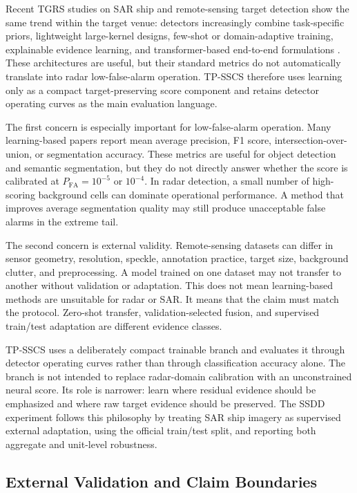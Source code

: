 \documentclass[journal]{IEEEtran}
\begin{document}
Recent TGRS studies on SAR ship and remote-sensing target detection show the same trend within the target venue: detectors increasingly combine task-specific priors, lightweight large-kernel designs, few-shot or domain-adaptive training, explainable evidence learning, and transformer-based end-to-end formulations \cite{liu2024evidence,zhou2024fewshot,shen2024ellknet,ma2024ssdnet,qin2025rdbdino}. These architectures are useful, but their standard metrics do not automatically translate into radar low-false-alarm operation. TP-SSCS therefore uses learning only as a compact target-preserving score component and retains detector operating curves as the main evaluation language.

The first concern is especially important for low-false-alarm operation. Many learning-based papers report mean average precision, F1 score, intersection-over-union, or segmentation accuracy. These metrics are useful for object detection and semantic segmentation, but they do not directly answer whether the score is calibrated at $P_{\mathrm{FA}}=10^{-5}$ or $10^{-4}$. In radar detection, a small number of high-scoring background cells can dominate operational performance. A method that improves average segmentation quality may still produce unacceptable false alarms in the extreme tail.

The second concern is external validity. Remote-sensing datasets can differ in sensor geometry, resolution, speckle, annotation practice, target size, background clutter, and preprocessing. A model trained on one dataset may not transfer to another without validation or adaptation. This does not mean learning-based methods are unsuitable for radar or SAR. It means that the claim must match the protocol. Zero-shot transfer, validation-selected fusion, and supervised train/test adaptation are different evidence classes.

TP-SSCS uses a deliberately compact trainable branch and evaluates it through detector operating curves rather than through classification accuracy alone. The branch is not intended to replace radar-domain calibration with an unconstrained neural score. Its role is narrower: learn where residual evidence should be emphasized and where raw target evidence should be preserved. The SSDD experiment follows this philosophy by treating SAR ship imagery as supervised external adaptation, using the official train/test split, and reporting both aggregate and unit-level robustness.

\subsection{External Validation and Claim Boundaries}
\end{document}
